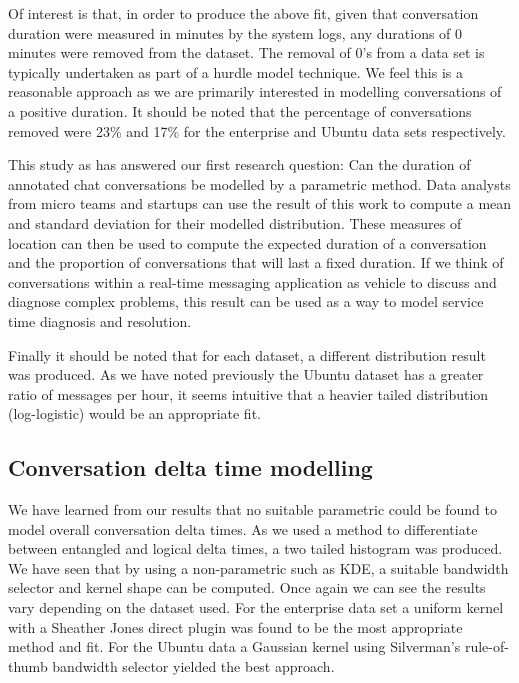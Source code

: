 \documentclass[conference]{IEEEtran}
\begin{document}
Of interest is that, in order to produce the above fit, given that conversation duration were measured in minutes by the system logs, any durations of 0 minutes were removed from the dataset. The removal of 0's from a data set is typically undertaken as part of a hurdle model technique. We feel this is a reasonable approach as we are primarily interested in modelling conversations of a positive duration. It should be noted that the percentage of conversations removed were 23\% and 17\% for the enterprise and Ubuntu data sets respectively. \par

This study as has answered our first research question: Can the duration of annotated chat conversations be modelled by a parametric method. Data analysts from micro teams and startups can use the result of this work to compute a mean and standard deviation for their modelled distribution. These measures of location can then be used to compute the expected duration of a conversation and the proportion of conversations that will last a fixed duration. If we think of conversations within a real-time messaging application as vehicle to discuss and diagnose complex problems, this result can be used as a way to model service time diagnosis and resolution. \par

Finally it should be noted that for each dataset, a different distribution result was produced. As we have noted previously the Ubuntu dataset has a greater ratio of messages per hour, it seems intuitive that a heavier tailed distribution (log-logistic) would be an appropriate fit. \par

\subsection{Conversation delta time modelling}

We have learned from our results that no suitable parametric could be found to model overall conversation delta times. As we used a method to differentiate between entangled and logical delta times, a two tailed histogram was produced. We have seen that by using a non-parametric such as KDE, a suitable bandwidth selector and kernel shape can be computed. Once again we can see the results vary depending on the dataset used. For the enterprise data set a uniform kernel with a Sheather Jones direct plugin was found to be the most appropriate method and fit. For the Ubuntu data a Gaussian kernel using Silverman's rule-of-thumb bandwidth selector yielded the best approach.
\end{document}
